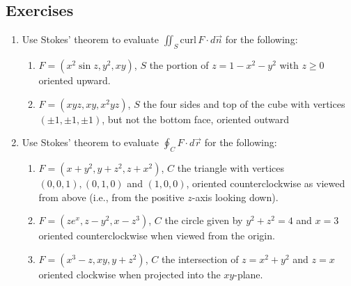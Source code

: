 \documentclass[12pt]{article}
\numberwithin{equation}{subsection}
\numberwithin{figure}{subsection}
\theoremstyle{note}
\newcommand{\curl}{\mathrm{curl\,}}
\begin{document}
{%


\subsection{Exercises}
\begin{enumerate}[label=\arabic*.]

\item Use Stokes' theorem to evaluate $\displaystyle \iint_{S} \curl F\cdot d\vec{n}$ for the following:

\begin{enumerate}
	\item $F=(x^2\sin z, y^2, xy)$, $S$ the portion of $z=1-x^2-y^2$ with $z\geq 0$ oriented upward. 
	\item $F=(xyz, xy, x^2yz)$, $S$ the four sides and top of the cube with vertices $(\pm 1, \pm 1, \pm 1)$, but not the bottom face, oriented outward
\end{enumerate}

\item Use Stokes' theorem to evaluate $\displaystyle \oint_C F\cdot d\vec{r}$ for the following:

\begin{enumerate}
	\item $F=(x+y^2, y+z^2, z+x^2)$, $C$ the triangle with vertices $(0,0,1), (0,1,0)$ and $(1,0,0)$, oriented counterclockwise as viewed from above (i.e., from the positive $z$-axis looking down). 
	\item $F=(ze^x, z-y^2, x-z^3)$, $C$ the circle given by $y^2+z^2=4$ and $x=3$ oriented counterclockwise when viewed from the origin. 
	\item $F=(x^3-z, xy, y+z^2)$,  $C$ the intersection of $z=x^2+y^2$ and $z=x$ oriented clockwise when projected into the $xy$-plane. 


\end{enumerate}
\end{enumerate}}
\end{document}
